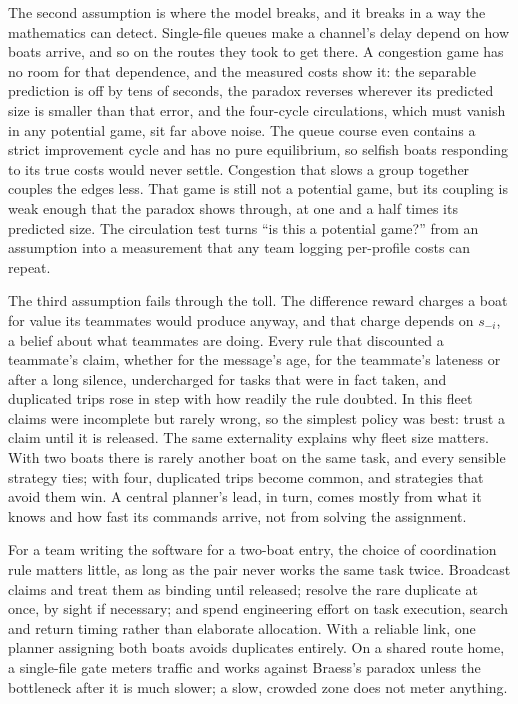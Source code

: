 \documentclass[11pt]{article}
\theoremstyle{definition}
\begin{document}
The second assumption is where the model breaks, and it breaks in a way the mathematics can detect. Single-file queues make a channel's delay depend on how boats arrive, and so on the routes they took to get there. A congestion game has no room for that dependence, and the measured costs show it: the separable prediction is off by tens of seconds, the paradox reverses wherever its predicted size is smaller than that error, and the four-cycle circulations, which must vanish in any potential game, sit far above noise. The queue course even contains a strict improvement cycle and has no pure equilibrium, so selfish boats responding to its true costs would never settle. Congestion that slows a group together couples the edges less. That game is still not a potential game, but its coupling is weak enough that the paradox shows through, at one and a half times its predicted size. The circulation test turns ``is this a potential game?'' from an assumption into a measurement that any team logging per-profile costs can repeat.

The third assumption fails through the toll. The difference reward charges a boat for value its teammates would produce anyway, and that charge depends on $s_{-i}$, a belief about what teammates are doing. Every rule that discounted a teammate's claim, whether for the message's age, for the teammate's lateness or after a long silence, undercharged for tasks that were in fact taken, and duplicated trips rose in step with how readily the rule doubted. In this fleet claims were incomplete but rarely wrong, so the simplest policy was best: trust a claim until it is released. The same externality explains why fleet size matters. With two boats there is rarely another boat on the same task, and every sensible strategy ties; with four, duplicated trips become common, and strategies that avoid them win. A central planner's lead, in turn, comes mostly from what it knows and how fast its commands arrive, not from solving the assignment.

For a team writing the software for a two-boat entry, the choice of coordination rule matters little, as long as the pair never works the same task twice. Broadcast claims and treat them as binding until released; resolve the rare duplicate at once, by sight if necessary; and spend engineering effort on task execution, search and return timing rather than elaborate allocation. With a reliable link, one planner assigning both boats avoids duplicates entirely. On a shared route home, a single-file gate meters traffic and works against Braess's paradox unless the bottleneck after it is much slower; a slow, crowded zone does not meter anything.
\end{document}
